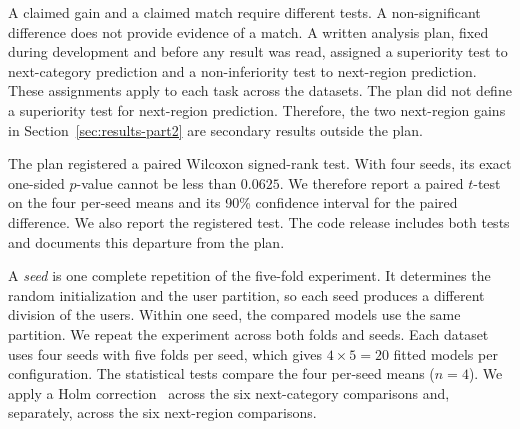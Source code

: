 A claimed gain and a claimed match require different tests. A non-significant difference does not provide evidence of a match. A written analysis plan, fixed during development and before any result was read, assigned a superiority test to next-category prediction and a non-inferiority test to next-region prediction. These assignments apply to each task across the datasets. The plan did not define a superiority test for next-region prediction. Therefore, the two next-region gains in Section~\ref{sec:results-part2} are secondary results outside the plan.

The plan registered a paired Wilcoxon signed-rank test. With four seeds, its exact one-sided $p$-value cannot be less than $0.0625$. We therefore report a paired $t$-test on the four per-seed means and its 90\% confidence interval for the paired difference. We also report the registered test. The code release includes both tests and documents this departure from the plan.

A \emph{seed} is one complete repetition of the five-fold experiment. It determines the random initialization and the user partition, so each seed produces a different division of the users. Within one seed, the compared models use the same partition. We repeat the experiment across both folds and seeds. Each dataset uses four seeds with five folds per seed, which gives $4\times5=20$ fitted models per configuration. The statistical tests compare the four per-seed means ($n{=}4$). We apply a Holm correction~\cite{holm1979} across the six next-category comparisons and, separately, across the six next-region comparisons.


